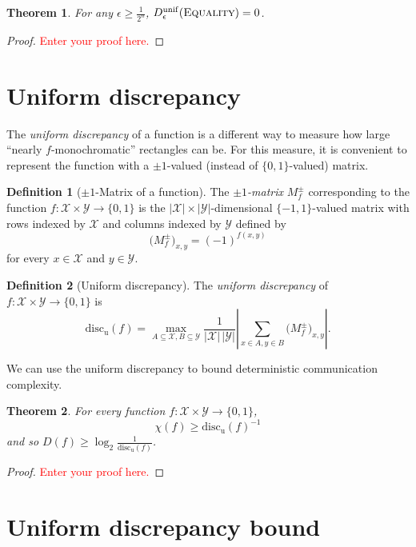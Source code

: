 \documentclass[11pt]{amsart}
\theoremstyle{plain}
\newtheorem{theorem}{Theorem}
\theoremstyle{definition}
\newtheorem{definition}{Definition}
\theoremstyle{plain}
\newcommand{\calX}{\mathcal{X}}
\newcommand{\calY}{\mathcal{Y}}
\newcommand{\discu}{\mathrm{disc_u}}
\newcommand{\replacethistext}[1]{\textcolor{red}{#1}}
\begin{document}
\begin{theorem}
For any $\epsilon \ge \frac1{2^n}$, $D_\epsilon^{\mathrm{unif}}(\textsc{Equality}) = 0$.
\end{theorem}

\begin{proof}
\replacethistext{Enter your proof here.}
\end{proof}


\newpage \section{Uniform discrepancy}

The \emph{uniform discrepancy} of a function is a different way to measure how large ``nearly $f$-monochromatic'' rectangles can be. For this measure, it is convenient to represent the function with a $\pm1$-valued (instead of $\{0,1\}$-valued) matrix.

\begin{definition}[$\pm 1$-Matrix of a function]
The \emph{$\pm 1$-matrix} $M^\pm_f$ corresponding to the function $f : \calX \times \calY \to \{0,1\}$ is the $|\calX| \times |\calY|$-dimensional $\{-1,1\}$-valued matrix with rows indexed by $\calX$ and columns indexed by $\calY$ defined by
\[
\big(M^{\pm}_f\big)_{x,y} = (-1)^{f(x,y)}
\]
for every $x \in \calX$ and $y \in \calY$.
\end{definition}

\begin{definition}[Uniform discrepancy]
The \emph{uniform discrepancy} of $f : \calX \times \calY \to \{0,1\}$ is
\[
\discu(f) = \max_{A \subseteq \calX, B \subseteq \calY} \frac{1}{|\calX| \, |\calY|} \left| \sum_{x \in A, y \in B} \big(M^{\pm}_f\big)_{x,y} \right|.
\]
\end{definition}

We can use the uniform discrepancy to bound deterministic communication complexity.

\begin{theorem}
For every function $f : \calX \times \calY \to \{0,1\}$,
\[
\chi(f) \ge \discu(f)^{-1}
\] 
and so $D(f) \ge \log_2 \frac1{\discu(f)}$.
\end{theorem}

\begin{proof}
\replacethistext{Enter your proof here.}
\end{proof}


\newpage \section{Uniform discrepancy bound}
\end{document}
